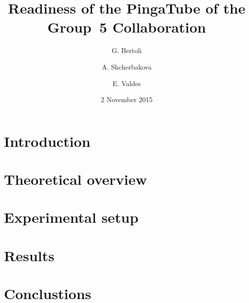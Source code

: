 \documentclass[a4paper, 10pt, notitlepage]{article}
\author{G. Bertoli \and A. Shcherbakova \and E. Valdes}
\title{Readiness of the PingaTube of the Group~5 Collaboration}
\date{2 November 2015}
\begin{document}
\maketitle

\begin{abstract}
  
\end{abstract}

\section{Introduction}
\label{sec:intro}


\section{Theoretical overview}
\label{sec:theory}


\section{Experimental setup}
\label{sec:setup}


\section{Results}
\label{sec:results}


\section{Conclustions}
\label{sec:conclusions}


\printbibliography
\end{document}
